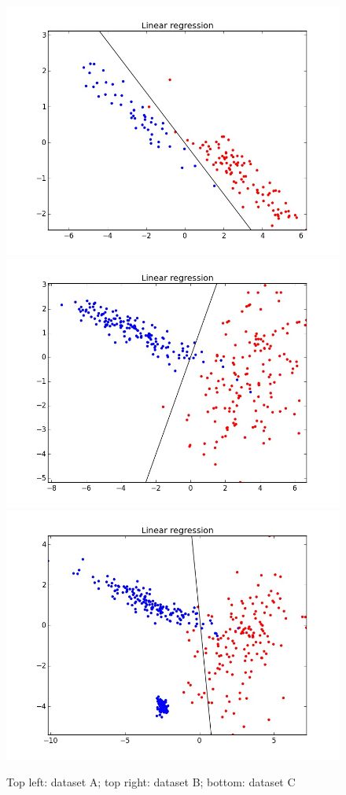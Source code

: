 \documentclass[11pt,a4paper]{article}
\begin{document}
\begin{figure}[H]
\centering
\noindent\includegraphics[scale=0.2]{images/linear_A.jpeg}
\noindent\includegraphics[scale=0.2]{images/linear_B.jpeg}
\noindent\includegraphics[scale=0.2]{images/linear_C.jpeg}
\caption{Top left: dataset A; top right: dataset B; bottom: dataset C}
\end{figure}
\end{document}
